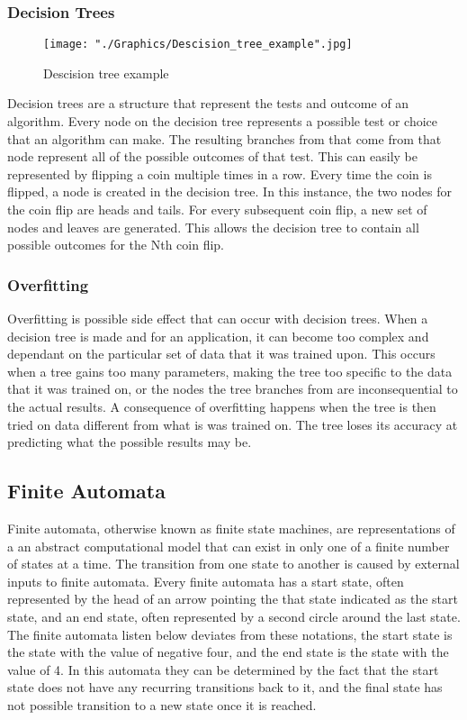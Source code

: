 \documentclass{sig-alternate}
\begin{document}
\subsubsection{Decision Trees}
\label{sec:decision_trees}
\begin{figure}[!]
	\texttt{[image: "./Graphics/Descision\_tree\_example".jpg]}
	\caption{Descision tree example}
	\label{fig:descisiontree}
\end{figure}
	Decision trees are a structure that represent the tests and outcome of an algorithm. Every node on the decision tree represents a possible test or choice that an algorithm can make. The resulting branches from that come from that node represent all of the possible outcomes of that test. This can easily be represented by flipping a coin multiple times in a row. Every time the coin is flipped, a node is created in the decision tree. In this instance, the two nodes for the coin flip are heads and tails. For every subsequent coin flip, a new set of nodes and leaves are generated. This allows the decision tree to contain all possible outcomes for the Nth coin flip.

\subsubsection{Overfitting}
\label{sec:overfitting}
	Overfitting is possible side effect that can occur with decision trees. When a decision tree is made and for an application, it can become too complex and dependant on the particular set of data that it was trained upon. This occurs when a tree gains too many parameters, making the tree too specific to the data that it was trained on, or the nodes the tree branches from are inconsequential to the actual results. A consequence of overfitting happens when the tree is then tried on data different from what is was trained on. The tree loses its accuracy at predicting what the possible results may be.
\subsection{Finite Automata}
\label{sec:finiteautomata}
	Finite automata, otherwise known as finite state machines, are representations of a an abstract computational model that can exist in only one of a finite number of states at a time. The transition from one state to another is caused by external inputs to finite automata. Every finite automata has a start state, often represented by the head of an arrow pointing the that state indicated as the start state, and an end state, often represented by a second circle around the last state. The finite automata listen below deviates from these notations, the start state is the state with the value of negative four, and the end state is the state with the value of 4. In this automata they can be determined by the fact that the start state does not have any recurring transitions back to it, and the final state has not possible transition to a new state once it is reached.
\end{document}
